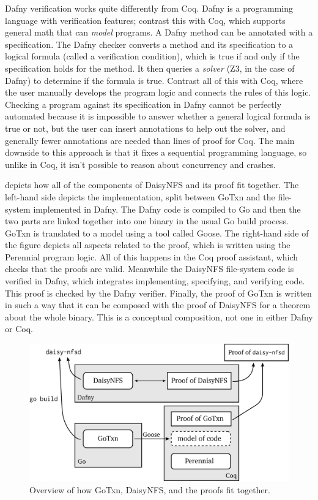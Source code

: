Dafny verification works quite differently from Coq. Dafny is a programming
language with verification features; contrast this with Coq, which supports
general math that can \emph{model} programs. A Dafny method can be annotated
with a specification. The Dafny checker converts a method and its specification
to a logical formula (called a verification condition), which is true if and only if the specification holds for
the method. It then queries a \emph{solver} (Z3, in the case of Dafny) to determine if the formula is true.
Contrast all of this with Coq, where the user manually develops the program
logic and connects the rules of this logic. Checking a program against its specification in Dafny cannot be perfectly
automated because it is impossible to answer whether a general logical formula
is true or not, but the user can insert annotations to help out the solver, and
generally fewer annotations are needed than lines of proof for Coq. The main
downside to this approach is that it fixes a sequential programming language, so
unlike in Coq, it isn't possible to reason about concurrency and crashes.

 depicts how all of the components of DaisyNFS and its proof
fit together. The left-hand side depicts the implementation, split between GoTxn
and the file-system implemented in Dafny. The Dafny code is compiled to Go and
then the two parts are linked together into one  binary in the
usual Go build process. GoTxn is translated to a model using a tool called
Goose. The right-hand side of the figure depicts all aspects related to the
proof, which is written using the Perennial program logic. All of this happens
in the Coq proof assistant, which checks that the proofs are valid. Meanwhile
the DaisyNFS file-system code is verified in Dafny, which integrates
implementing, specifying, and verifying code. This proof is checked by the Dafny
verifier. Finally, the proof of GoTxn is written in such a way that it can be
composed with the proof of DaisyNFS for a theorem about the whole
 binary. This is a conceptual composition, not one in either
Dafny or Coq.

\begin{figure}[ht]
\includegraphics{fig/overview.png}
\caption{Overview of how GoTxn, DaisyNFS, and the proofs fit together.}
\label{fig:overview}
\end{figure}

